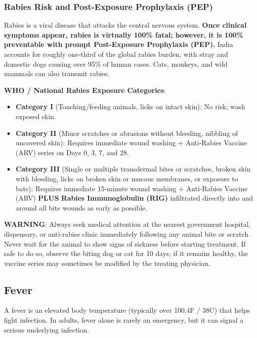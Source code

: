 \subsubsection{Rabies Risk and Post-Exposure Prophylaxis (PEP)}

Rabies is a viral disease that attacks the central nervous system. \textbf{Once clinical symptoms appear, rabies is virtually 100\% fatal; however, it is 100\% preventable with prompt Post-Exposure Prophylaxis (PEP).} India accounts for roughly one-third of the global rabies burden, with stray and domestic dogs causing over 95\% of human cases. Cats, monkeys, and wild mammals can also transmit rabies.

\textbf{WHO / National Rabies Exposure Categories}:
\begin{itemize}[leftmargin=*]
  \item \textbf{Category I} (Touching/feeding animals, licks on intact skin): No risk; wash exposed skin.
  \item \textbf{Category II} (Minor scratches or abrasions without bleeding, nibbling of uncovered skin): Requires immediate wound washing + Anti-Rabies Vaccine (ARV) series on Days 0, 3, 7, and 28.
  \item \textbf{Category III} (Single or multiple transdermal bites or scratches, broken skin with bleeding, licks on broken skin or mucous membranes, or exposure to bats): Requires immediate 15-minute wound washing + Anti-Rabies Vaccine (ARV) \textbf{PLUS} \textbf{Rabies Immunoglobulin (RIG)} infiltrated directly into and around all bite wounds as early as possible.
\end{itemize}

\textbf{WARNING}: Always seek medical attention at the nearest government hospital, dispensary, or anti-rabies clinic immediately following any animal bite or scratch. Never wait for the animal to show signs of sickness before starting treatment. If safe to do so, observe the biting dog or cat for 10 days; if it remains healthy, the vaccine series may sometimes be modified by the treating physician.

\subsection{Fever}

A fever is an elevated body temperature (typically over 100.4\textdegree F / 38\textdegree C) that helps fight infection. In adults, fever alone is rarely an emergency, but it can signal a serious underlying infection.

